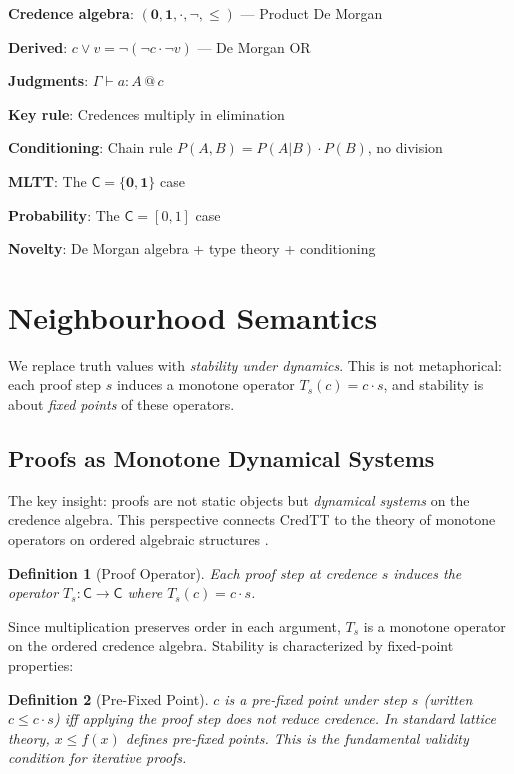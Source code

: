\documentclass[11pt,a4paper]{article}
\makeatletter
\newtheorem{definition}{Definition}[section]
\newcommand{\C}{\mathsf{C}}
\newcommand{\at}[1]{\,@\,#1}
\newcommand{\one}{\mathbf{1}}
\newcommand{\zero}{\mathbf{0}}
\newcommand{\negc}{\neg}
\makeatother
\begin{document}
\textbf{Credence algebra}: $(\zero, \one, \cdot, \negc, \leq)$ --- Product De Morgan

\textbf{Derived}: $c \vee v = \negc(\negc c \cdot \negc v)$ --- De Morgan OR

\textbf{Judgments}: $\Gamma \vdash a : A \at{c}$

\textbf{Key rule}: Credences multiply in elimination

\textbf{Conditioning}: Chain rule $P(A,B) = P(A|B) \cdot P(B)$, no division

\textbf{MLTT}: The $\C = \{\zero, \one\}$ case

\textbf{Probability}: The $\C = {[0,1]}$ case

\textbf{Novelty}: De Morgan algebra + type theory + conditioning

\section{Neighbourhood Semantics}

We replace truth values with \emph{stability under dynamics}. This is not metaphorical: each proof step $s$ induces a monotone operator $T_s(c) = c \cdot s$, and stability is about \emph{fixed points} of these operators.

\subsection{Proofs as Monotone Dynamical Systems}

The key insight: proofs are not static objects but \emph{dynamical systems} on the credence algebra. This perspective connects CredTT to the theory of monotone operators on ordered algebraic structures \citep{tarski1955lattice, cousot1979constructive}.

\begin{definition}[Proof Operator]
Each proof step at credence $s$ induces the operator $T_s : \C \to \C$ where $T_s(c) = c \cdot s$.
\end{definition}

Since multiplication preserves order in each argument, $T_s$ is a monotone operator on the ordered credence algebra. Stability is characterized by fixed-point properties:

\begin{definition}[Pre-Fixed Point]
$c$ is a \emph{pre-fixed point} under step $s$ (written $c \leq c \cdot s$) iff applying the proof step does not reduce credence. In standard lattice theory, $x \leq f(x)$ defines pre-fixed points. This is the fundamental validity condition for iterative proofs.
\end{definition}
\end{document}
